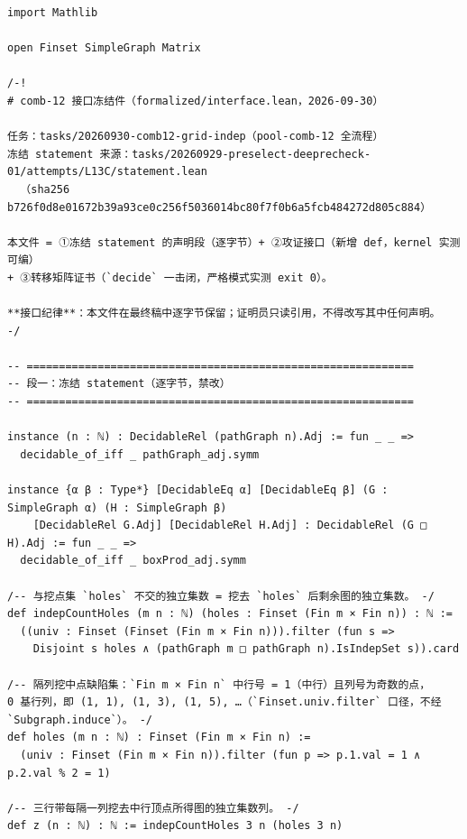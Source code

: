 \documentclass[11pt]{article}
\begin{document}
\begin{lstlisting}[basicstyle=\ttfamily\footnotesize,caption={Complete proof
file of Theorem~\ref{thm:rec}, verbatim lines 1--1188 (whole file) of
\texttt{attempts/final-c\_z\_rec.lean} (sha256 \texttt{9a837835}). Mixed
line endings on the working disk (lines 1--485 and 953--1189 LF, 486--952
CRLF) are spliced LF-normalised per the chorded/ladder precedent;
byte-exact original in \texttt{proofs/}.},label={lst:proof}]
import Mathlib

open Finset SimpleGraph Matrix

/-!
# comb-12 接口冻结件（formalized/interface.lean，2026-09-30）

任务：tasks/20260930-comb12-grid-indep（pool-comb-12 全流程）
冻结 statement 来源：tasks/20260929-preselect-deeprecheck-01/attempts/L13C/statement.lean
  （sha256 b726f0d8e01672b39a93ce0c256f5036014bc80f7f0b6a5fcb484272d805c884）

本文件 = ①冻结 statement 的声明段（逐字节）+ ②攻证接口（新增 def，kernel 实测可编）
+ ③转移矩阵证书（`decide` 一击闭，严格模式实测 exit 0）。

**接口纪律**：本文件在最终稿中逐字节保留；证明员只读引用，不得改写其中任何声明。
-/

-- ============================================================
-- 段一：冻结 statement（逐字节，禁改）
-- ============================================================

instance (n : ℕ) : DecidableRel (pathGraph n).Adj := fun _ _ =>
  decidable_of_iff _ pathGraph_adj.symm

instance {α β : Type*} [DecidableEq α] [DecidableEq β] (G : SimpleGraph α) (H : SimpleGraph β)
    [DecidableRel G.Adj] [DecidableRel H.Adj] : DecidableRel (G □ H).Adj := fun _ _ =>
  decidable_of_iff _ boxProd_adj.symm

/-- 与挖点集 `holes` 不交的独立集数 = 挖去 `holes` 后剩余图的独立集数。 -/
def indepCountHoles (m n : ℕ) (holes : Finset (Fin m × Fin n)) : ℕ :=
  ((univ : Finset (Finset (Fin m × Fin n))).filter (fun s =>
    Disjoint s holes ∧ (pathGraph m □ pathGraph n).IsIndepSet s)).card

/-- 隔列挖中点缺陷集：`Fin m × Fin n` 中行号 = 1（中行）且列号为奇数的点，
0 基行列，即 (1, 1), (1, 3), (1, 5), …（`Finset.univ.filter` 口径，不经 `Subgraph.induce`）。 -/
def holes (m n : ℕ) : Finset (Fin m × Fin n) :=
  (univ : Finset (Fin m × Fin n)).filter (fun p => p.1.val = 1 ∧ p.2.val % 2 = 1)

/-- 三行带每隔一列挖去中行顶点所得图的独立集数列。 -/
def z (n : ℕ) : ℕ := indepCountHoles 3 n (holes 3 n)


\end{lstlisting}
\end{document}
